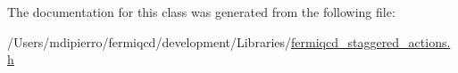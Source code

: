 The documentation for this class was generated from the following file:\begin{DoxyCompactItemize}
\item 
/Users/mdipierro/fermiqcd/development/Libraries/\hyperlink{fermiqcd__staggered__actions_8h}{fermiqcd\_\-staggered\_\-actions.h}\end{DoxyCompactItemize}
